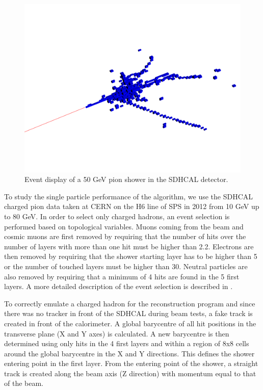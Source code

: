 \documentclass[12pt]{article}
\begin{document}
\begin{figure}
  \vspace{-20pt}
  \begin{center}
    \includegraphics[width=\linewidth]{SingleParticleSetup.pdf}
  \end{center}
  \vspace{-10pt}
  \caption{\label{ARBOR_SINGLE_PARTICLE_SETUP} Event display of a 50 GeV pion shower in the SDHCAL detector.}
\end{figure}

To study the single particle performance of the algorithm, we use the SDHCAL charged pion data taken at CERN on the H6 line of SPS in 2012 from 10 GeV up to 80 GeV. In order to select only charged hadrons, an event selection is performed based on topological variables. Muons coming from the beam and cosmic muons are first removed by requiring that the number of hits over the number of layers with more than one hit must be higher than 2.2. Electrons are then removed by requiring that the shower starting layer has to be higher than 5 or the number of touched layers must be higher than 30. Neutral particles are also removed by requiring that a minimum of 4 hits are found in the 5 first layers. A more detailed description of the event selection is described in \cite{sdhcal-paper}.

To correctly emulate a charged hadron for the reconstruction program and since there was no tracker in front of the SDHCAL during beam tests, a fake track is created in front of the calorimeter. A global barycentre of all hit positions in the transverse plane (X and Y axes) is calculated. A new barycentre is then determined using only hits in the 4 first layers and within a region of 8x8 cells around the global barycentre in the X and Y directions. This defines the shower entering point in the first layer. From the entering point of the shower, a straight track is created along the beam axis (Z direction) with momentum equal to that of the beam.
\end{document}
